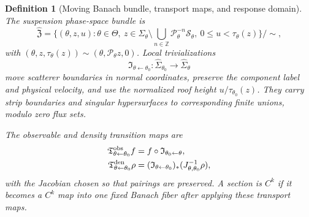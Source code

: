 \documentclass[11pt]{amsart}
\theoremstyle{compactplain}
\theoremstyle{compactdefinition}
\newtheorem{definition}[theorem]{Definition}
\theoremstyle{compactremark}
\newcommand{\Thetacal}{\Theta}
\newcommand{\Pcal}{\mathcal P}
\newcommand{\Ssing}{\mathcal S}
\begin{document}
\begin{definition}[Moving Banach bundle, transport maps, and response domain]
\label{def:moving_banach_bundle_response_domain}
The suspension phase-space bundle is
\begin{equation}
  \widehat{\mathfrak Z}
  =\{(\theta,z,u):\theta\in\Thetacal,\ z\in\Sigma_\theta\setminus
  \bigcup_{n\in\mathbb Z}\Pcal_\theta^{-n}\Ssing_\theta,\ 0\le u<\tau_\theta(z)\}/\sim,
\end{equation}
with $(\theta,z,\tau_\theta(z))\sim(\theta,\Pcal_\theta z,0)$.  Local
trivializations
\begin{equation}
  \mathfrak I_{\theta\leftarrow\theta_0}:
  \widehat\Sigma_{\theta_0}\to\widehat\Sigma_\theta
\end{equation}
move scatterer boundaries in normal coordinates, preserve the component label
and physical velocity, and use the normalized roof height
$u/\tau_{\theta_0}(z)$.  They carry strip boundaries and singular hypersurfaces
to corresponding finite unions, modulo zero flux sets.

The observable and density transition maps are
\begin{align}
  \mathfrak T^{\rm obs}_{\theta\leftarrow\theta_0}f
  &=f\circ\mathfrak I_{\theta_0\leftarrow\theta},\\
  \mathfrak T^{\rm den}_{\theta\leftarrow\theta_0}\rho
  &=(\mathfrak I_{\theta\leftarrow\theta_0})_*
    (J_{\theta,\theta_0}^{-1}\rho),
\end{align}
with the Jacobian chosen so that pairings are preserved.  A section is $C^k$ if
it becomes a $C^k$ map into one fixed Banach fiber after applying these
transport maps.


\end{definition}
\end{document}
